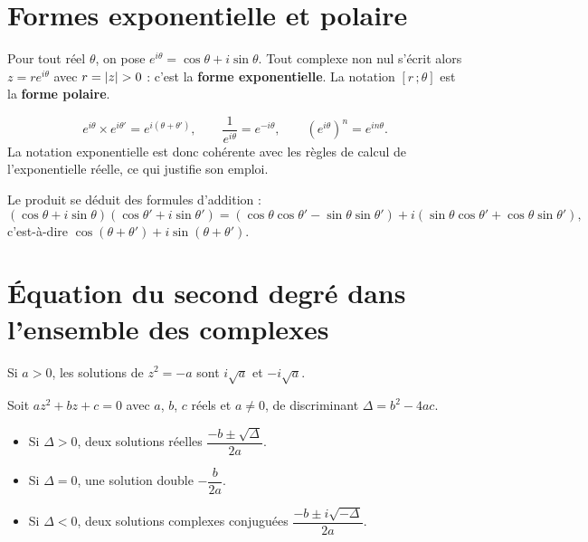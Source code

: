 \section{Formes exponentielle et polaire}

\begin{definition}
Pour tout réel $\theta$, on pose
$e^{i\theta} = \cos\theta+i\sin\theta$. Tout complexe non nul s'écrit alors
$z = re^{i\theta}$ avec $r = \abs z>0$ : c'est la \textbf{forme
exponentielle}. La notation $[r\,;\theta]$ est la \textbf{forme polaire}.
\end{definition}

\begin{propriete}
\[
  e^{i\theta}\times e^{i\theta'} = e^{i(\theta+\theta')}, \qquad
  \frac{1}{e^{i\theta}} = e^{-i\theta}, \qquad
  \left(e^{i\theta}\right)^{n} = e^{in\theta}.
\]
La notation exponentielle est donc cohérente avec les règles de calcul de
l'exponentielle réelle, ce qui justifie son emploi.
\end{propriete}

\begin{demonstration}
Le produit se déduit des formules d'addition :
\[
  (\cos\theta+i\sin\theta)(\cos\theta'+i\sin\theta')
  = \left(\cos\theta\cos\theta'-\sin\theta\sin\theta'\right)
  +i\left(\sin\theta\cos\theta'+\cos\theta\sin\theta'\right),
\]
c'est-à-dire $\cos(\theta+\theta')+i\sin(\theta+\theta')$.
\end{demonstration}

\section{Équation du second degré dans l'ensemble des complexes}

\begin{theoreme}
Si $a>0$, les solutions de $z^{2} = -a$ sont $i\sqrt a$ et $-i\sqrt a$.
\end{theoreme}

\begin{theoreme}
Soit $az^{2}+bz+c = 0$ avec $a$, $b$, $c$ réels et $a \neq 0$, de
discriminant $\Delta = b^{2}-4ac$.
\begin{itemize}[leftmargin=*, itemsep=0.1em]
  \item Si $\Delta>0$, deux solutions réelles
        $\dfrac{-b\pm\sqrt\Delta}{2a}$.
  \item Si $\Delta = 0$, une solution double $-\dfrac{b}{2a}$.
  \item Si $\Delta<0$, deux solutions complexes conjuguées
        $\dfrac{-b\pm i\sqrt{-\Delta}}{2a}$.
\end{itemize}
\end{theoreme}

